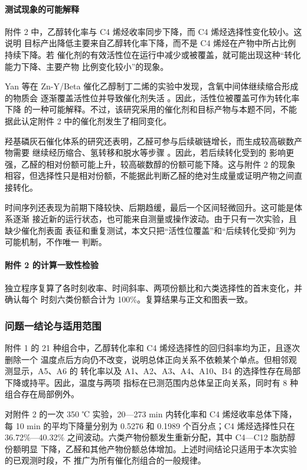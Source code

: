 \paragraph{测试现象的可能解释}

附件 2 中，乙醇转化率与 C4 烯烃收率同步下降，而 C4 烯烃选择性变化较小。这说明
目标产出降低主要来自乙醇转化率下降，而不是 C4 烯烃在产物中所占比例持续下降。若
催化剂的有效活性位在运行中减少或被覆盖，就可能出现这种``转化能力下降、主要产物
比例变化较小''的现象。

Yan 等在 Zn-Y/Beta 催化乙醇制丁二烯的实验中发现，含氧中间体继续缩合形成的物质会
逐渐覆盖活性位并导致催化剂失活 \cite{yan2018}。因此，活性位被覆盖可作为转化率下降
的一种可能解释。不过，该研究采用的催化剂和目标产物与本题不同，不能据此认定附件 2
中的催化剂发生了相同变化。

羟基磷灰石催化体系的研究还表明，乙醛可参与后续碳链增长，而生成较高碳数产物需要
继续经历缩合、氢转移和脱水等步骤 \cite{ho2016,moteki2016}。因此，若后续转化受到的
影响更强，乙醛的相对份额可能上升，较高碳数醇的份额可能下降。这与附件 2 的现象
相容，但选择性只是相对份额，不能据此判断乙醛的绝对生成量或证明产物之间直接转化。

时间序列还表现为前期下降较快、后期趋缓，最后一个区间轻微回升。这可能是体系逐渐
接近新的运行状态，也可能来自测量或操作波动。由于只有一次实验，且缺少催化剂表面
表征和重复测试，本文只把``活性位覆盖''和``后续转化受抑''列为可能机制，不作唯一
判断。

\paragraph{附件 2 的计算一致性检验}

独立程序复算了各时刻收率、时间斜率、两项份额比和六类选择性的首末变化，并确认每个
时刻六类份额合计为 100\%。复算结果与正文和图表一致。

\subsubsection{问题一结论与适用范围}

附件 1 的 21 种组合中，乙醇转化率和 C4 烯烃选择性的回归斜率均为正，且逐次删除一个
温度点后方向仍不改变，说明总体正向关系不依赖某个单点。但相邻观测显示，A5、A6 的
转化率以及 A1、A2、A3、A4、A10、B4 的选择性存在局部下降或持平。因此，温度与两项
指标在已测范围内总体呈正向关系，同时有 8 种组合存在局部例外。

对附件 2 的一次 350 ℃ 实验，20---273 min 内转化率和 C4 烯烃收率总体下降，每
10 min 的平均下降量分别为 0.5276 和 0.1989 个百分点；C4 烯烃选择性只在
36.72\%---40.32\% 之间波动。六类产物份额发生重新分配，其中 C4---C12 脂肪醇份额明显
下降，乙醛和其他产物份额总体增加。上述时间结论只适用于本次实验的已观测时段，不
推广为所有催化剂组合的一般规律。
